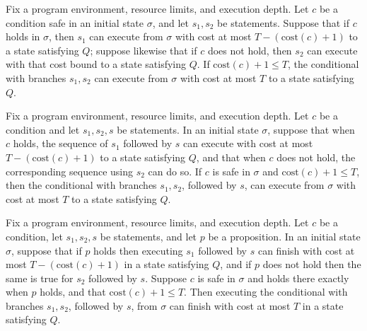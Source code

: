 \begin{theorem}
\label{Light.Ends.iteLast}
\leanok
{}
Fix a program environment, resource limits, and execution depth. Let $c$ be a condition
safe in an initial state $\sigma$, and let $s_1,s_2$ be statements. Suppose that if $c$
holds in $\sigma$, then $s_1$ can execute from $\sigma$ with cost at most
$T-(\mathrm{cost}(c)+1)$ to a state satisfying $Q$; suppose likewise that if $c$ does
not hold, then $s_2$ can execute with that cost bound to a state satisfying $Q$. If
$\mathrm{cost}(c)+1\le T$, the conditional with branches $s_1,s_2$ can execute from
$\sigma$ with cost at most $T$ to a state satisfying $Q$.
\end{theorem}

\begin{theorem}
\label{Light.Ends.iteThen}
\leanok
{}
Fix a program environment, resource limits, and execution depth. Let $c$ be a condition
and let $s_1,s_2,s$ be statements. In an initial state $\sigma$, suppose that when $c$
holds, the sequence of $s_1$ followed by $s$ can execute with cost at most
$T-(\mathrm{cost}(c)+1)$ to a state satisfying $Q$, and that when $c$ does not hold, the
corresponding sequence using $s_2$ can do so. If $c$ is safe in $\sigma$ and
$\mathrm{cost}(c)+1\le T$, then the conditional with branches $s_1,s_2$, followed by
$s$, can execute from $\sigma$ with cost at most $T$ to a state satisfying $Q$.
\end{theorem}

\begin{theorem}
\label{Light.Ends.iteIffThen}
\leanok
{}
Fix a program environment, resource limits, and execution depth. Let $c$ be a condition,
let $s_1,s_2,s$ be statements, and let $p$ be a proposition. In an initial state
$\sigma$, suppose that if $p$ holds then executing $s_1$ followed by $s$ can finish with
cost at most $T-(\mathrm{cost}(c)+1)$ in a state satisfying $Q$, and if $p$ does not
hold then the same is true for $s_2$ followed by $s$. Suppose $c$ is safe in $\sigma$
and holds there exactly when $p$ holds, and that $\mathrm{cost}(c)+1\le T$. Then
executing the conditional with branches $s_1,s_2$, followed by $s$, from $\sigma$ can
finish with cost at most $T$ in a state satisfying $Q$.
\end{theorem}

